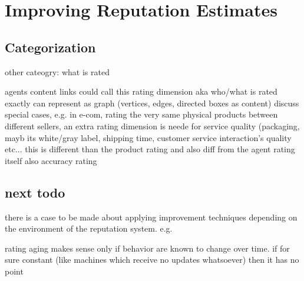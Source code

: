 \documentclass[%
    ]{\PathToTumTemplate/thesis/tum_thesis}
\begin{document}








\section{Improving Reputation Estimates}\label{sec:estimate_improvements}

\subsection{Categorization}

other cateogry: what is rated


agents 
content
links
could call this rating dimension aka who/what is rated exactly
can represent as graph (vertices, edges, directed boxes as content)
discuss special cases, e.g. in e-com, rating the very same physical products between different sellers, an extra rating dimension is neede for service quality (packaging, mayb its white/gray label, shipping time, customer service interaction's quality etc... this is different than the product rating and also diff from the agent rating itself
also accuracy rating


\subsection{next todo}

there is a case to be made about applying improvement techniques depending on the environment of the reputation system. e.g.

rating aging makes sense only if behavior are known to change over time. if for sure constant (like machines which receive no updates whatsoever) then it has no point
\end{document}
